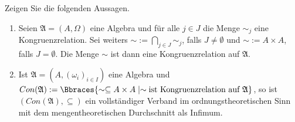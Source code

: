 \begin{exercise}
    Zeigen Sie die folgenden Aussagen.
    \begin{enumerate}[label = \alph*)]
        \item \label{kongru} Seien $\mathfrak{A} = (A, \Omega)$ eine Algebra und für alle $j \in J$ die Menge $\sim_j$ eine Kongruenzrelation. Sei weiters $\sim := \bigcap_{j \in J} \sim_j$, falls $J \neq \emptyset$ und $\sim := A \times A$, falls $J = \emptyset$. Die Menge $\sim$ ist dann eine Kongruenzrelation auf $\mathfrak{A}$.
        \item Ist $\mathfrak{A} = (A, (\omega_i)_{i \in I})$ eine Algebra und $Con(\mathfrak{A}) := \Bbraces{\sim \subseteq A \times A \mid \sim \text{ist Kongruenzrelation auf } \mathfrak{A}}$, so ist $(Con(\mathfrak{A}), \subseteq)$ ein vollständiger Verband im ordnungstheoretischen Sinn mit dem mengentheoretischen Durchschnitt als Infimum.
    \end{enumerate}
\end{exercise}

